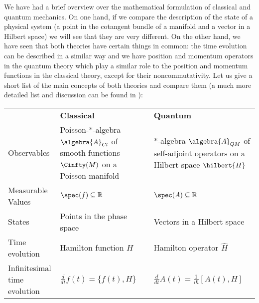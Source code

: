 We have had a brief overview over the mathematical formulation of classical and quantum mechanics. On one hand, if we compare the description of the state of a physical system (a point in the cotangent bundle of a manifold and a vector in a Hilbert space) we will see that they are very different. On the other hand, we have seen that both theories have certain things in common: the time evolution can be described in a similar way and we have position and momentum operators in the quantum theory which play a similar role to the position and momentum functions in the classical theory, except for their noncommutativity. Let us give a short list of the main concepts of both theories and compare them (a much more detailed list and discussion can be found in \cite{waldmann:2007a}):
\bgroup
\renewcommand{\arraystretch}{1.6}
\begin{center}
	\begin{tabular}
	{lll}
		~ 
		&
		\textbf{Classical} 
		&
		\textbf{Quantum}
		\\
		\parbox{4cm}
		{
			Observables
		}
		&
		\parbox{5cm}{
			Poisson-*-algebra $\algebra{A}_{Cl}$
			of \\
			smooth functions $\Cinfty(M)$ \\
			on a Poisson manifold
		}
		&
		\parbox{5cm}{
			*-algebra $\algebra{A}_{QM}$
			of self-adjoint operators
			on a Hilbert space $\hilbert{H}$
		}
		\\
		\parbox{4cm}
		{
			Measurable 
			Values
		}
		&
		$\spec (f) \subseteq \mathbb{R}$
		&
		$\spec (A) \subseteq \mathbb{R}$
		\\
		States
		&
		\parbox{5cm}{
			Points in the
			phase space
		}
		&
		\parbox{5cm}{
			Vectors in a
			Hilbert space
		}
		\\
		Time evolution
		&
		Hamilton function $H$
		&
		Hamilton operator $\hat{H}$
		\\
		\parbox{4cm}{
			Infinitesimal\\
			time evolution
		}
		&
		$
		\frac{d}{dt} f(t)
		=
		\{f(t), H\}
		$
		&
		$\frac{d}{dt} A(t)
		=
		\frac{1}{i \hbar}
		[A(t), H]
		$
	\end{tabular} 
\end{center}
\egroup

